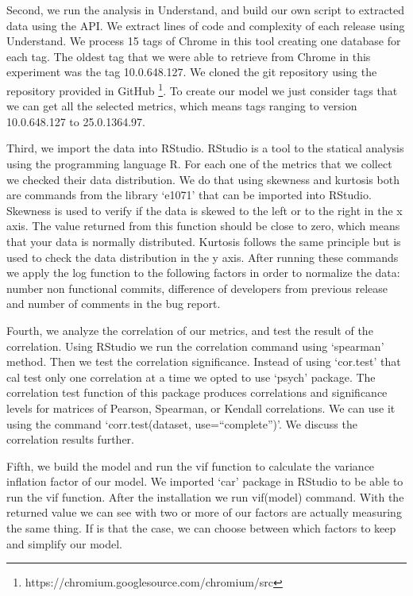 Second, we run the analysis in Understand, and build our own script to extracted data using the API. We extract lines of code and complexity of each release using Understand. We process 15 tags of Chrome in this tool creating one database for each tag. The oldest tag that we were able to retrieve from Chrome in this experiment was the tag 10.0.648.127. We cloned the git repository using the repository provided in GitHub \footnote{https://chromium.googlesource.com/chromium/src}. To create our model we just consider tags that we can get all the selected metrics, which means tags ranging to version 10.0.648.127 to 25.0.1364.97.

Third, we import the data into RStudio. RStudio is a tool to the statical analysis using the programming language R. For each one of the metrics that we collect we checked their data distribution. We do that using skewness and kurtosis both are commands from the library `e1071' that can be imported into RStudio. Skewness is used to verify if the data is skewed to the left or to the right in the x axis. The value returned from this function should be close to zero, which means that your data is normally distributed. Kurtosis follows the same principle but is used to check the data distribution in the y axis. After running these commands we apply the log function to the following factors in order to normalize the data: number non functional commits, difference of developers from previous release and number of comments in the bug report. 

Fourth, we analyze the correlation of our metrics,  and test the result of the correlation. Using RStudio we run the correlation command using `spearman' method. Then we test the correlation significance. Instead of using `cor.test' that cal test only one correlation at a time we opted to use `psych' package. The correlation test function of this package produces correlations and significance levels for matrices of Pearson, Spearman, or Kendall correlations. We can use it using the command `corr.test(dataset, use=``complete'')'. We discuss the correlation results further. 

Fifth, we build the model and run the vif function to calculate the variance inflation factor of our model. We imported `car' package in RStudio to be able to run the vif function.
After the installation we run vif(model) command. With the returned value we can see with two or more of our factors are actually measuring the same thing. If is that the case, we can choose between which factors to keep and simplify our model.  

